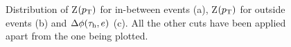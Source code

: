 \begin{figure}[H]
	\centering
	\hfill
	\hfill
	\caption{Distribution of Z$(p_\text{T})$ for in-between events (a), Z$(p_\text{T})$ for outside events (b) and $\Delta\phi(\tau_\text{h},e)$ (c). All the other cuts have been applied apart from the one being plotted.}
	\label{Fig22}
\end{figure}